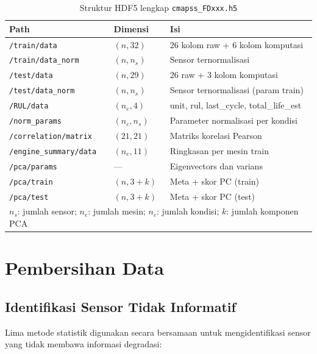\documentclass[11pt,a4paper]{article}
\begin{document}
\begin{table}[H]
\centering\small
\caption{Struktur HDF5 lengkap \texttt{cmapss\_FDxxx.h5}}
\label{tab:hdf5}
\begin{tabular}{llp{6cm}}
\toprule
Path & Dimensi & Isi \\
\midrule
\texttt{/train/data}       & $(n, 32)$        & 26 kolom raw + 6 kolom komputasi \\
\texttt{/train/data\_norm} & $(n, n_s)$       & Sensor ternormalisasi \\
\texttt{/test/data}        & $(n, 29)$        & 26 raw + 3 kolom komputasi \\
\texttt{/test/data\_norm}  & $(n, n_s)$       & Sensor ternormalisasi (param train) \\
\texttt{/RUL/data}         & $(n_e, 4)$       & unit, rul, last\_cycle, total\_life\_est \\
\texttt{/norm\_params}     & $(n_c, n_s)$     & Parameter normalisasi per kondisi \\
\texttt{/correlation/matrix} & $(21, 21)$     & Matriks korelasi Pearson \\
\texttt{/engine\_summary/data} & $(n_e, 11)$  & Ringkasan per mesin train \\
\texttt{/pca/params}       & ---              & Eigenvectors dan varians \\
\texttt{/pca/train}        & $(n, 3+k)$       & Meta + skor PC (train) \\
\texttt{/pca/test}         & $(n, 3+k)$       & Meta + skor PC (test) \\
\bottomrule
\multicolumn{3}{l}{\small $n_s$: jumlah sensor; $n_e$: jumlah mesin; $n_c$: jumlah kondisi; $k$: jumlah komponen PCA}
\end{tabular}
\end{table}

\section{Pembersihan Data}

\subsection{Identifikasi Sensor Tidak Informatif}

Lima metode statistik digunakan secara bersamaan untuk mengidentifikasi sensor
yang tidak membawa informasi degradasi:
\end{document}
